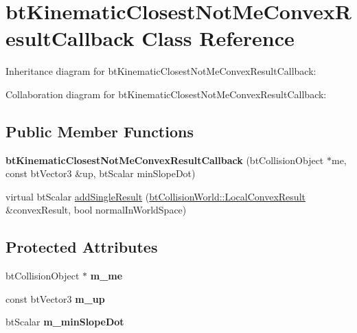 \hypertarget{classbt_kinematic_closest_not_me_convex_result_callback}{\section{bt\+Kinematic\+Closest\+Not\+Me\+Convex\+Result\+Callback Class Reference}
\label{classbt_kinematic_closest_not_me_convex_result_callback}
}


Inheritance diagram for bt\+Kinematic\+Closest\+Not\+Me\+Convex\+Result\+Callback\+:


Collaboration diagram for bt\+Kinematic\+Closest\+Not\+Me\+Convex\+Result\+Callback\+:
\subsection*{Public Member Functions}
\begin{DoxyCompactItemize}
\item 
\hypertarget{classbt_kinematic_closest_not_me_convex_result_callback_af3bacb5219f6508a8fa54c2a2358f68c}{{\bfseries bt\+Kinematic\+Closest\+Not\+Me\+Convex\+Result\+Callback} (bt\+Collision\+Object $\ast$me, const bt\+Vector3 \&up, bt\+Scalar min\+Slope\+Dot)}\label{classbt_kinematic_closest_not_me_convex_result_callback_af3bacb5219f6508a8fa54c2a2358f68c}

\item 
virtual bt\+Scalar \hyperlink{classbt_kinematic_closest_not_me_convex_result_callback_a793706b7811ea2d917349ed1501a77a5}{add\+Single\+Result} (\hyperlink{structbt_collision_world_1_1_local_convex_result}{bt\+Collision\+World\+::\+Local\+Convex\+Result} \&convex\+Result, bool normal\+In\+World\+Space)
\end{DoxyCompactItemize}
\subsection*{Protected Attributes}
\begin{DoxyCompactItemize}
\item 
\hypertarget{classbt_kinematic_closest_not_me_convex_result_callback_a7571571d1adef1f11bde7c9e53e67c8d}{bt\+Collision\+Object $\ast$ {\bfseries m\+\_\+me}}\label{classbt_kinematic_closest_not_me_convex_result_callback_a7571571d1adef1f11bde7c9e53e67c8d}

\item 
\hypertarget{classbt_kinematic_closest_not_me_convex_result_callback_a27cb64c495b0dca9e5254a9f788ced88}{const bt\+Vector3 {\bfseries m\+\_\+up}}\label{classbt_kinematic_closest_not_me_convex_result_callback_a27cb64c495b0dca9e5254a9f788ced88}

\item 
\hypertarget{classbt_kinematic_closest_not_me_convex_result_callback_aff708f4951a12e1b4f0e541ded6ee568}{bt\+Scalar {\bfseries m\+\_\+min\+Slope\+Dot}}\label{classbt_kinematic_closest_not_me_convex_result_callback_aff708f4951a12e1b4f0e541ded6ee568}

\end{DoxyCompactItemize}
